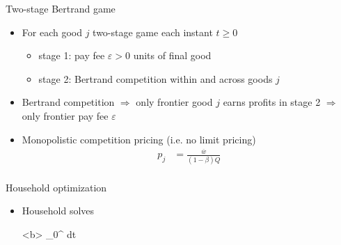 \documentclass[english,usenames,dvipsnames,handout]{beamer}
\begin{document}
\begin{frame}{Two-stage Bertrand game}\label{two_stage_bertrand}
	\hyperlink{closing_the_model}{}
	\begin{itemize}
		\item For each good $j$ two-stage game each instant $t \ge 0$
		\begin{itemize}
			\item stage 1: pay fee $\varepsilon > 0$ units of final good
			\item stage 2: Bertrand competition within and across goods $j$
		\end{itemize}
		\item Bertrand competition $\Rightarrow$ only frontier good $j$ earns profits in stage 2 $\Rightarrow$ only frontier pay fee $\varepsilon$
		\item Monopolistic competition pricing (i.e. no limit pricing)
		\begin{align*}
		p_j &= \frac{\overline{w}}{(1-\beta) Q} \\
		\end{align*}
	\end{itemize}
\end{frame}


\begin{frame}{Household optimization}\label{household_optimization}
	\hyperlink{closing_the_model}{}
	\begin{itemize}
		\item Household solves
		\tiny
		\begin{maxi*}[1]<b>
			{} { \int_0^{\infty}  dt}{}{}
		\end{maxi*}
	\end{itemize}
\end{frame}
\end{document}
